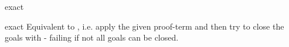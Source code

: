 \begin{tactic}{exact}
  \begin{tsyntax}[empty]{exact}
  Equivalent to , i.e. apply the given
  proof-term and then try to close the goals with  - failing
  if not all goals can be closed.
  \end{tsyntax}
\end{tactic}
